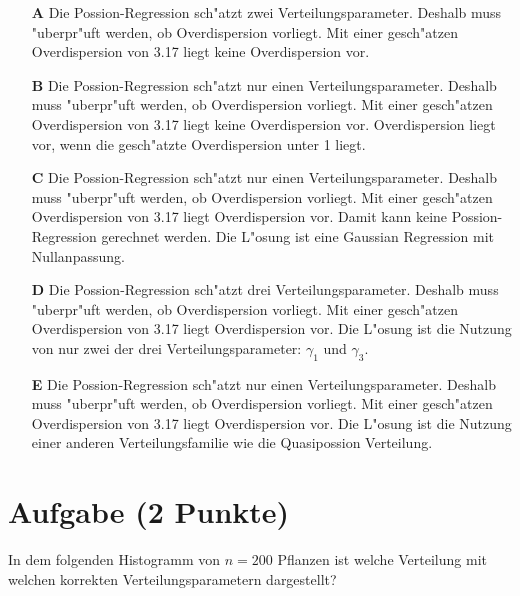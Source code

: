 \documentclass[a4paper, 10pt]{scrartcl}\usepackage[]{graphicx}\usepackage[]{xcolor}
\begin{document}
\begin{enumerate}
\item [\textbf{A} \msquare] Die Possion-Regression sch{"a}tzt zwei Verteilungsparameter. Deshalb muss {"u}berpr{"u}ft werden, ob Overdispersion vorliegt. Mit einer gesch{"a}tzen Overdispersion von 3.17 liegt keine Overdispersion vor.
\item [\textbf{B} \msquare] Die Possion-Regression sch{"a}tzt nur einen Verteilungsparameter. Deshalb muss {"u}berpr{"u}ft werden, ob Overdispersion vorliegt. Mit einer gesch{"a}tzen Overdispersion von 3.17 liegt keine Overdispersion vor. Overdispersion liegt vor, wenn die gesch{"a}tzte Overdispersion unter 1 liegt.
\item [\textbf{C} \msquare] Die Possion-Regression sch{"a}tzt nur einen Verteilungsparameter. Deshalb muss {"u}berpr{"u}ft werden, ob Overdispersion vorliegt. Mit einer gesch{"a}tzen Overdispersion von 3.17 liegt Overdispersion vor. Damit kann keine Possion-Regression gerechnet werden. Die L{"o}sung ist eine Gaussian Regression mit Nullanpassung.
\item [\textbf{D} \msquare] Die Possion-Regression sch{"a}tzt drei Verteilungsparameter. Deshalb muss {"u}berpr{"u}ft werden, ob Overdispersion vorliegt. Mit einer gesch{"a}tzen Overdispersion von 3.17 liegt Overdispersion vor. Die L{"o}sung ist die Nutzung von nur zwei der drei Verteilungsparameter: $\gamma_1$ und $\gamma_3$.
\item [\textbf{E} \msquare] Die Possion-Regression sch{"a}tzt nur einen Verteilungsparameter. Deshalb muss {"u}berpr{"u}ft werden, ob Overdispersion vorliegt. Mit einer gesch{"a}tzen Overdispersion von 3.17 liegt Overdispersion vor. Die L{"o}sung ist die Nutzung einer anderen Verteilungsfamilie wie die Quasipossion Verteilung.
\end{enumerate} 

\section{Aufgabe \hfill (2 Punkte)}

In dem folgenden Histogramm von $n = 200$ Pflanzen ist welche Verteilung
mit welchen korrekten Verteilungsparametern dargestellt?
\end{document}

